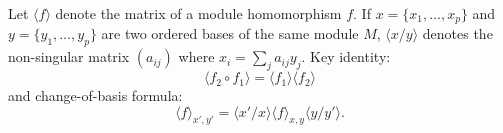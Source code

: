Let $\langle f \rangle$ denote the matrix of a module homomorphism $f$. If $x = \{x_1, \ldots, x_p\}$ and $y = \{y_1, \ldots, y_p\}$ are two ordered bases of the same module $M$, $\langle x/y \rangle$ denotes the non-singular matrix $(a_{ij})$ where $x_i = \sum_j a_{ij} y_j$. Key identity:
$$\langle f_2 \circ f_1 \rangle = \langle f_1 \rangle \langle f_2 \rangle$$
and change-of-basis formula:
$$\langle f \rangle_{x',y'} = \langle x'/x \rangle \langle f \rangle_{x,y} \langle y/y' \rangle.$$
